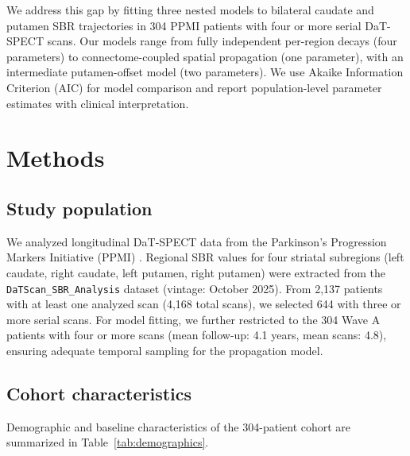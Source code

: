 We address this gap by fitting three nested models to bilateral caudate and putamen SBR trajectories in 304 PPMI patients with four or more serial DaT-SPECT scans. Our models range from fully independent per-region decays (four parameters) to connectome-coupled spatial propagation (one parameter), with an intermediate putamen-offset model (two parameters). We use Akaike Information Criterion (AIC) for model comparison and report population-level parameter estimates with clinical interpretation.

\section{Methods}

\subsection{Study population}

We analyzed longitudinal DaT-SPECT data from the Parkinson's Progression Markers Initiative (PPMI) \cite{ppmi2011}. Regional SBR values for four striatal subregions (left caudate, right caudate, left putamen, right putamen) were extracted from the \texttt{DaTScan\_SBR\_Analysis} dataset (vintage: October 2025). From 2,137 patients with at least one analyzed scan (4,168 total scans), we selected 644 with three or more serial scans. For model fitting, we further restricted to the 304 Wave A patients with four or more scans (mean follow-up: 4.1 years, mean scans: 4.8), ensuring adequate temporal sampling for the propagation model.

\subsection{Cohort characteristics}

Demographic and baseline characteristics of the 304-patient cohort are summarized in Table~\ref{tab:demographics}.

